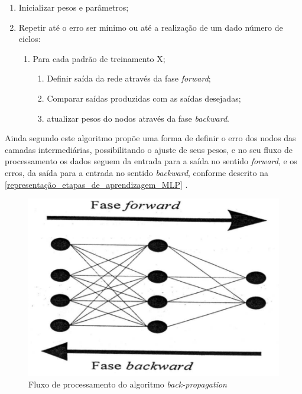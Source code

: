 \documentclass[
	12pt,				%
	openright,			%
	twoside,			%
	a4paper,			%
	english,			%
	french,				%
	spanish,			%
	brazil				%
	]{abntex2}
\begin{document}
\begin{enumerate}
	\item Inicializar pesos e parâmetros;
	\item Repetir até o erro ser mínimo ou até a realização de um dado número de ciclos:
	\begin{enumerate}
		\item Para cada padrão de treinamento X;
				\begin{enumerate}
					\item Definir saída da rede através da fase \emph{forward};
					\item Comparar saídas produzidas com as saídas desejadas;
					\item atualizar pesos do nodos através da fase \emph{backward}.
		\end{enumerate}
	\end{enumerate}
	
\end{enumerate}

Ainda segundo  este algoritmo propõe uma forma de definir o erro dos nodos das camadas intermediárias, possibilitando o ajuste de seus pesos, e no seu fluxo de processamento  os dados seguem da entrada para a saída no sentido \emph{forward}, e os erros, da saída para a entrada no sentido \emph{backward}, conforme descrito na \autoref{representação_etapas_de_aprendizagem_MLP} .

\begin{figure}[htb]
	\caption{\label{representação_etapas_de_aprendizagem_MLP}Fluxo de processamento do algoritmo \emph{back-propagation}}
	\begin{center}
	    \includegraphics[scale=0.5]{imagens/etapas_MLP.png}
	\end{center}
\end{figure}
\end{document}

